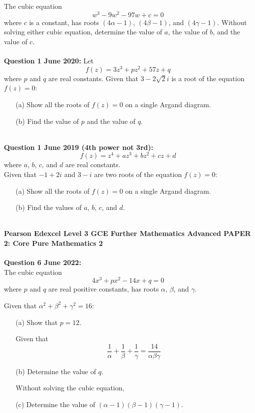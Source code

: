 \documentclass[12pt]{article}
\begin{document}
The cubic equation
\[w^3 - 9w^2 - 97w + c = 0\]
where \( c \) is a constant, has roots \( (4\alpha - 1) \), \( (4\beta - 1) \), and \( (4\gamma - 1) \).
Without solving either cubic equation, determine the value of \( a \), the value of \( b \), and the value of \( c \).\\\\

\textbf{Question 1 June 2020:}
Let 
\[f(z) = 3z^3 + pz^2 + 57z + q\]
where \( p \) and \( q \) are real constants. Given that \( 3 - 2\sqrt{2}i \) is a root of the equation \( f(z) = 0 \):
\begin{enumerate}
    \item[(a)] Show all the roots of \( f(z) = 0 \) on a single Argand diagram.    
    \item[(b)] Find the value of \( p \) and the value of \( q \).\\\\
\end{enumerate}

\textbf{Question 1 June 2019 (4th power not 3rd):}
\[f(z) = z^4 + az^3 + bz^2 + cz + d\] where \( a \), \( b \), \( c \), and \( d \) are real constants.\\
Given that \( -1 + 2i \) and \( 3 - i \) are two roots of the equation \( f(z) = 0 \):

\begin{enumerate}
    \item[(a)] Show all the roots of \( f(z) = 0 \) on a single Argand diagram.
    \item[(b)] Find the values of \( a \), \( b \), \( c \), and \( d \).\\\\
\end{enumerate}

\textbf{Pearson Edexcel Level 3 GCE Further Mathematics
Advanced PAPER 2: Core Pure Mathematics 2}\\\\

\textbf{Question 6 June 2022:}\\
The cubic equation
\[4x^3 + px^2 - 14x + q = 0\]
where \( p \) and \( q \) are real positive constants, has roots \( \alpha \), \( \beta \), and \( \gamma \).

Given that \( \alpha^2 + \beta^2 + \gamma^2 = 16 \):

\begin{enumerate}
    \item[(a)] Show that \( p = 12 \).
    
    Given that 
    \[\frac{1}{\alpha} + \frac{1}{\beta} + \frac{1}{\gamma} = \frac{14}{\alpha \beta \gamma}\]
    \item[(b)] Determine the value of \( q \).
    
    Without solving the cubic equation,
    \item[(c)] Determine the value of \( (\alpha - 1)(\beta - 1)(\gamma - 1) \).
\end{enumerate}
\end{document}
